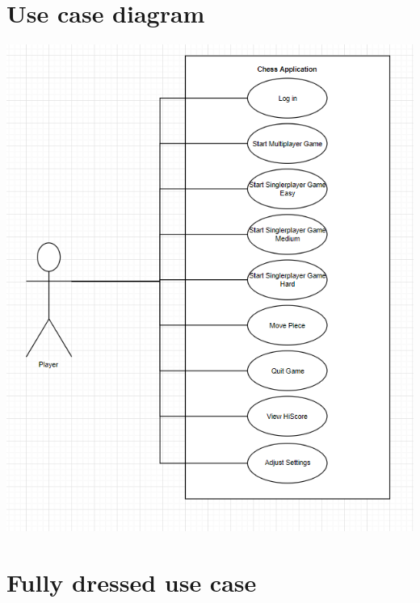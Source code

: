 \documentclass[letterpaper,11pt]{article}
\begin{document}
\section*{Use case diagram}
\begin{center}
\includegraphics[width=16cm]{Use-Case-Diagram-New.png}
\end{center}
\newpage
\section*{Fully dressed use case}
\end{document}

